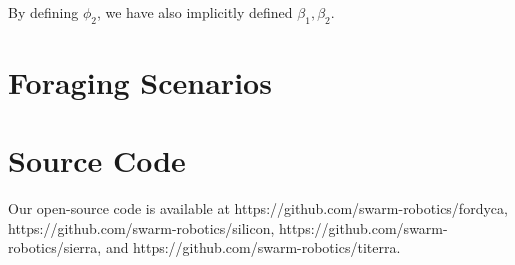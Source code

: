 By defining $\phi_2$, we have also implicitly defined $\beta_1,\beta_2$.

\section{Foraging Scenarios}\label{sec:exp-foraging-scenarios}


\section{Source Code}\label{sec:exp-source-code}


Our open-source code is available at https://github.com/swarm-robotics/fordyca,
https://github.com/swarm-robotics/silicon,
https://github.com/swarm-robotics/sierra, and
https://github.com/swarm-robotics/titerra.
